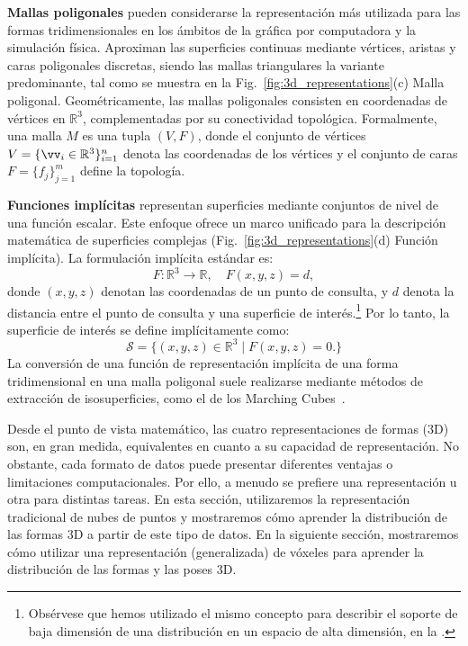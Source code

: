 \documentclass[../../book-main_es.tex]{subfiles}
\begin{document}
\textbf{Mallas poligonales}
pueden considerarse la representación más utilizada para las formas tridimensionales
en los ámbitos de la gráfica por computadora y la simulación física. Aproximan
las superficies continuas mediante vértices, aristas y caras poligonales
discretas, siendo las mallas triangulares la variante predominante, tal como
se muestra en la Fig.~\ref{fig:3d_representations}(c) Malla poligonal.
Geométricamente, las mallas poligonales consisten en coordenadas de vértices en $\mathbb{R}^3$,
complementadas por su conectividad topológica. Formalmente, una malla $M$ es una tupla
$(V,F)$, donde el conjunto de vértices $V=\{\vv_i\in\mathbb{R}^3\}_{i=1}^n$
denota las coordenadas de los vértices y el conjunto de caras $F=\{f_j\}_{j=1}^m$
define la topología.

\textbf{Funciones implícitas}
representan superficies mediante conjuntos de nivel de una función escalar. Este enfoque
ofrece un marco unificado para la descripción matemática de
superficies complejas (Fig.~\ref{fig:3d_representations}(d) Función implícita).
La formulación implícita estándar es:
\begin{equation}
\label{eq:implicit_function}
F: \mathbb{R}^3 \rightarrow \mathbb{R}, \quad F(x,y,z) = d,
\end{equation}
donde $(x,y,z)$ denotan las coordenadas de un punto de consulta, y $d$
denota la distancia entre el punto de consulta y una superficie de
interés.\footnote{Obsérvese que hemos utilizado el mismo concepto para
describir el soporte de baja dimensión de una distribución en un
espacio de alta dimensión, en la .} Por lo tanto, la
superficie de interés se define implícitamente como:
\begin{equation}
\label{eq:implicit_function_surface}
\mathcal{S} = \{ (x,y,z) \in \mathbb{R}^3 \mid F(x,y,z)=0. \}
\end{equation}
La conversión de una función de representación implícita de una forma tridimensional
en una malla poligonal suele realizarse mediante métodos de extracción de isosuperficies,
como el de los Marching Cubes~\cite{10.1145/280811.281026}.

Desde el punto de vista matemático, las cuatro representaciones de formas (3D) son, en gran medida,
equivalentes en cuanto a su capacidad de representación.
No obstante, cada formato de datos puede presentar diferentes
ventajas o limitaciones computacionales. Por ello, a menudo se
prefiere una representación u otra para distintas tareas. En esta sección, utilizaremos la
representación tradicional de nubes de puntos y mostraremos cómo aprender la
distribución de las formas 3D a partir de este tipo de datos. En la siguiente
sección, mostraremos cómo utilizar una representación (generalizada) de vóxeles
para aprender la distribución de las formas y las poses 3D.
\end{document}
